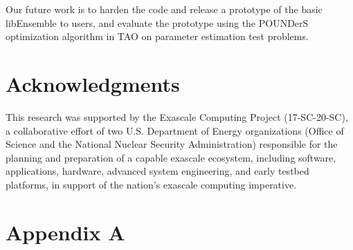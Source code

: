 \documentclass{ecpreport}
\begin{document}
Our future work is to harden the code and release a prototype of the
basic libEnsemble to users, and evaluate the prototype using the 
POUNDerS optimization algorithm in TAO on parameter estimation 
test problems.

\section*{Acknowledgments}

This research was supported by the Exascale Computing Project (17-SC-20-SC), a collaborative 
effort of two U.S. Department of Energy organizations (Office of Science and the National 
Nuclear Security Administration) responsible for the planning and preparation of a 
capable exascale ecosystem, including software, applications, hardware, advanced 
system engineering, and early testbed platforms, in support of the nation’s 
exascale computing imperative.





\newpage
\appendix
\section{Appendix A}

\end{document}
